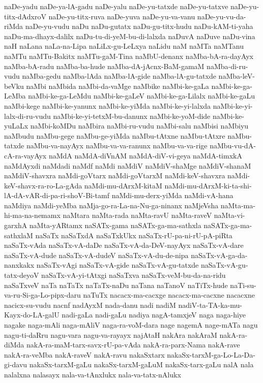 {naDe-yadu
naDe-ya-lA-gadu
naDe-yalu
naDe-yu-tatxde
naDe-yu-tatxve
naDe-yu-titx-dAdxroV
naDe-yu-titx-ruva
naDe-yuva
naDe-yu-va-vanu
naDe-yu-vu-da-riMda
naDe-yu-vudu
naDu
naDu-gutatx
naDu-gu-titx-hudu
naDu-kAM-ti-yaha
naDu-ma-dhayx-dalilx
naDu-tu-di-yeM-bu-di-lalxda
naDuvA
naDuve
naDu-vina
naH
naLana
naLa-na-Lipa
naLiLx-gu-LeLxya
naLidu
naM
naMTa
naMTanu
naMTu
naMTu-Bakitx
naMTu-gaM-Tina
naMbU-denanx
naMba-bA-ra-dayAyx
naMba-bA-radu
naMba-ba-hude
naMba-dA-jAcnx-BaM-gamaM
naMba-di-ru-vudu
naMba-gedu
naMba-lAda
naMba-lA-gide
naMba-lA-gu-tatxde
naMba-leV-beVku
naMbi
naMbida
naMbi-da-vaMge
naMbike
naMbi-ke-gaLa
naMbi-ke-ga-LeMba
naMbi-ke-ga-LeMdu
naMbi-ke-gaLeV
naMbi-ke-ga-Lilalx
naMbi-ke-gaLu
naMbi-kege
naMbi-ke-yanunx
naMbi-ke-yiMda
naMbi-ke-yi-lalxda
naMbi-ke-yi-lalx-di-ru-vudu
naMbi-ke-yi-tetxM-bu-danunx
naMbi-ke-yoM-dide
naMbi-ke-yuLaLx
naMbi-koMDu
naMbira
naMbi-ru-vudu
naMbi-salu
naMbisi
naMbiyu
naMbudu
naMbu-gege
naMbu-ge-yiMda
naMbu-tAtxne
naMbu-tAtxre
naMbu-tatxde
naMbu-va-nayAyx
naMbu-va-va-ranunx
naMbu-va-va-rige
naMbu-vu-dA-cA-ra-vayAyx
naMdA
naMdA-diVnAM
naMdA-diV-vi-geya
naMdA-timxkA
naMdAyxdi
naMdadi
naMdf
naMdi
naMdiV
naMdiV-shaMge
naMdiV-shanaM
naMdiV-shavxra
naMdi-goVtarx
naMdi-goVtarxM
naMdi-keV-shavxra
naMdi-keV-shavx-ra-ro-La-gAda
naMdi-mu-dArxM-kitaM
naMdi-mu-dArxM-ki-ta-shi-lA-dA-vAR-di-pa-ri-shoV-Bi-tamf
naMdi-mu-derx-yiMda
naMdi-vA-hana
naMdiya
naMdi-yeMba
naMja-go-ra-La-na-Nu-ga-ninanx
naMjeVsha
naMta-ma-hi-ma-na-nemamx
naMtara
naMta-rada
naMta-ravU
naMta-raveV
naMta-vi-garxhA
naMta-yARtamx
naSATx-gama
naSATx-ga-ma-sathxla
naSATx-ga-ma-sathxlaM
naSaTx
naSaTxdA
naSaTxkUkx
naSaTx-rU-pa-ni-rU-pA-piRta
naSaTx-vAda
naSaTx-vA-daDe
naSaTx-vA-da-DeV-nayAyx
naSaTx-vA-dare
naSaTx-vA-dude
naSaTx-vA-dudeV
naSaTx-vA-du-de-nipa
naSaTx-vA-ga-da-nanxkakx
naSaTx-vAgi
naSaTx-vA-gide
naSaTx-vA-gu-tatxde
naSaTx-vA-gu-tatx-deyoV
naSaTx-vA-yi-tAtxgi
naSaTxva
naSaTx-veM-bu-da-na-ridu
naSaTxveV
naTa
naTaTx
naTaTx-naDu
naTana
naTanoV
naTiTx-hude
naTi-su-va-ru-Si-ga-Lo-pipx-daru
naTuTx
nacacx-ma-cacxge
nacacx-ma-cacxne
nacacxne
nacicx-su-vudu
nacnf
nadAyxM
nada-danu
nadi
nadiM
nadiV-ta-TA-ka-mu-Kayx-do-LA-galU
nadi-gaLa
nadi-gaLu
nadiya
nagA-tamxjeV
naga
naga-hiye
nagake
naga-mAli
naga-mAliV
naga-ra-voM-dara
nage
nagemA
nage-mATa
nagu
nagu-ti-daRru
nagu-vara
nagu-va-rayayx
najAtaH
nakAra
nakAraM
nakA-ra-diMda
nakA-ra-maM-tarx-savx-rU-pa-vAda
nakA-ra-parx-Nama
nakA-rave
nakA-ra-veMba
nakA-raveV
nakA-ravu
nakaSxtarx
nakaSx-tarxM-ga-Lo-La-Da-gi-davu
nakaSx-tarxM-gaLu
nakaSx-tarxM-gaLuM
nakaSx-tarx-gaLu
nalA
nala
nalalxna
nalasayx
nala-va-tAnxlukx
nala-va-tatx-nAlukx
}
